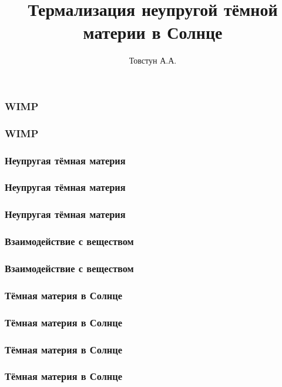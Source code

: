 


\title{Термализация неупругой тёмной материи в Солнце} 
\author[]{Товстун А.А.}
	
	\begin{frame}
		\titlepage %
	\end{frame}
	
	\begin{frame}
		\frametitle{WIMP}
		
	\end{frame}
	
	\begin{frame}
		\frametitle{WIMP}
		
	\end{frame}
	
	\begin{frame}
		\frametitle{Неупругая тёмная материя}
		
	\end{frame}
	
	\begin{frame}
		\frametitle{Неупругая тёмная материя}
		
	\end{frame}
	
	\begin{frame}
		\frametitle{Неупругая тёмная материя}
		
	\end{frame}
	
	\begin{frame}
		\frametitle{Взаимодействие с веществом}
		
	\end{frame}
	
	\begin{frame}
		\frametitle{Взаимодействие с веществом}
		
	\end{frame}
	
	\begin{frame}
		\frametitle{Тёмная материя в Солнце}
		
	\end{frame}
	
	\begin{frame}
		\frametitle{Тёмная материя в Солнце}
		
	\end{frame}

	\begin{frame}
	\frametitle{Тёмная материя в Солнце}
	
	\end{frame}
	
	\begin{frame}
		\frametitle{Тёмная материя в Солнце}
		
	\end{frame}
	
